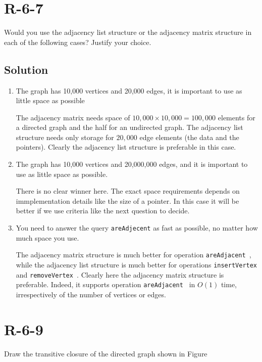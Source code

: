 \documentclass[a4paper,12pt]{article}
\begin{document}
\section*{R-6-7}
Would you use the adjacency list structure or the adjacency matrix
structure in each of the following cases? Justify your choice.

\subsection*{Solution}
 \begin {enumerate} 
 
 \item The graph has 10,000 vertices and 20,000 edges, it is important to use as little space as possible
 
 The adjacency matrix needs space of $10,000 \times 10,000 = 100,000$ elements for a directed graph and the half for an undirected graph. The adjacency list structure needs only storage for $20,000$ edge elements (the data and the pointers). Clearly the adjacency list structure is preferable in this case. 
 
 \item The graph has 10,000 vertices and 20,000,000 edges, and it is important to use as little space as possible.
 
 There is no clear winner here. The exact space requirements depends on immplementation details like the size of a pointer. In this case it will be better if we use criteria like the next question to decide.
 
\item You need to answer the query \texttt{areAdjecent} as fast as possible, no matter how
much space you use.
 
 The adjacency matrix structure is much better for operation \texttt{areAdjacent }, while the adjacency list structure is much better for operations \texttt{insertVertex } and \texttt{removeVertex }. Clearly here the adjacency matrix structure is preferable. Indeed, it supports operation \texttt{areAdjacent } in $O(1)$ time, irrespectively of the number of vertices or edges. 

\end {enumerate} 
 

\section*{R-6-9}
Draw the transitive closure of the directed graph shown in Figure
\end{document}
